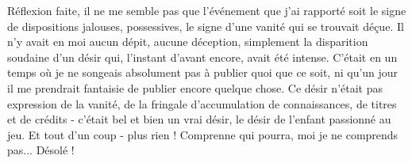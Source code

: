 Réflexion faite, il ne me semble pas que l'événement que j'ai rapporté soit le signe de dispositions jalouses, possessives, le signe d'une vanité qui se trouvait déçue. Il n'y avait en moi aucun dépit, aucune déception, simplement la disparition soudaine d'un désir qui, l'instant d'avant encore, avait été intense. C'était en un temps où je ne songeais absolument pas à publier quoi que ce soit, ni qu'un jour il me prendrait fantaisie de publier encore quelque chose. Ce désir n'était pas expression de la vanité, de la fringale d'accumulation de connaissances, de titres et de crédits - c'était bel et bien un vrai désir, le désir de l'enfant passionné au jeu. Et tout d'un coup - plus rien ! Comprenne qui pourra, moi je ne comprends pas... Désolé !



